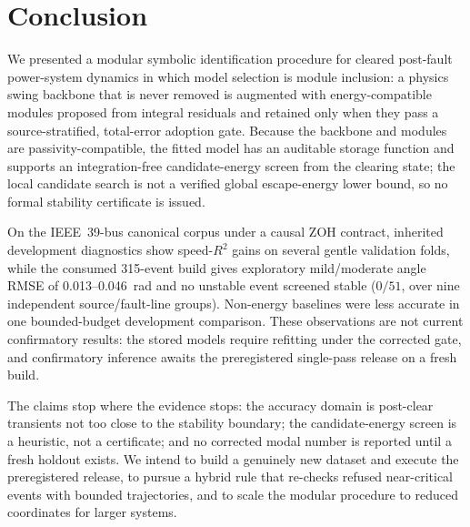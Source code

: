 \documentclass[journal]{IEEEtran}
\begin{document}
\section{Conclusion}
\label{sec:conclusion}

We presented a modular symbolic identification procedure for cleared post-fault
power-system dynamics in which model selection is module inclusion: a physics
swing backbone that is never removed is augmented with energy-compatible modules
proposed from integral residuals and retained only when they pass a
source-stratified, total-error adoption gate. Because the backbone
and modules are passivity-compatible, the fitted model has an auditable storage
function and supports an integration-free candidate-energy screen from the
clearing state; the local candidate search is not a verified global
escape-energy lower bound, so no formal stability certificate is issued.

On the IEEE~39-bus canonical corpus under a causal ZOH contract, inherited
development diagnostics show speed-$R^2$ gains on several gentle validation
folds, while the consumed 315-event build gives exploratory mild/moderate angle
RMSE of 0.013--0.046~rad and no unstable event screened stable ($0/51$, over nine
independent source/fault-line groups). Non-energy baselines were less accurate
in one bounded-budget development comparison. These observations are not current
confirmatory results: the stored models require refitting under the corrected
gate, and confirmatory inference awaits the preregistered single-pass release on
a fresh build.

The claims stop where the evidence stops: the accuracy domain is post-clear
transients not too close to the stability boundary; the candidate-energy screen
is a heuristic, not a certificate; and no corrected modal number is reported
until a fresh holdout exists. We intend to build a genuinely new dataset and
execute the preregistered release, to pursue a hybrid rule that re-checks refused
near-critical events with bounded trajectories, and to scale the modular
procedure to reduced coordinates for larger systems.

\balance


\end{document}
